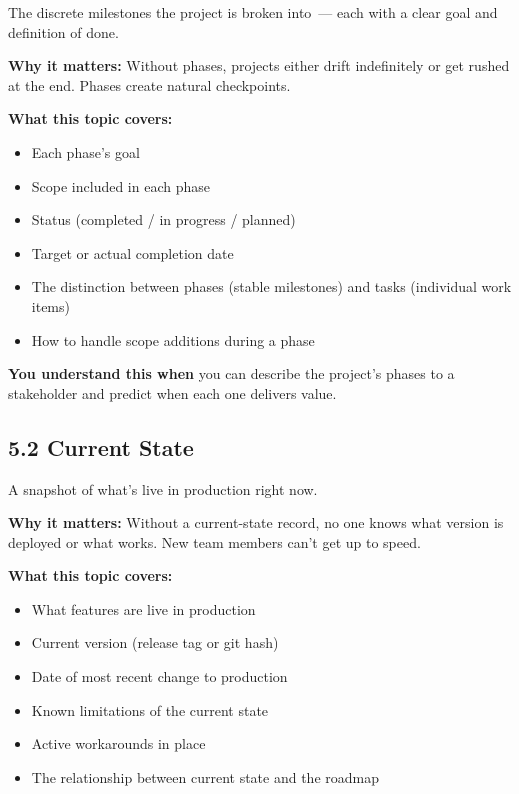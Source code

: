 The discrete milestones the project is broken into~--- each with a clear goal and definition of done.

\textbf{Why it matters:} Without phases, projects either drift indefinitely or get rushed at the end. Phases create natural checkpoints.

\textbf{What this topic covers:}

\begin{itemize}
\tightlist
\item
  Each phase's goal
\item
  Scope included in each phase
\item
  Status (completed / in progress / planned)
\item
  Target or actual completion date
\item
  The distinction between phases (stable milestones) and tasks (individual work items)
\item
  How to handle scope additions during a phase
\end{itemize}

\noindent{}\textbf{You understand this when} you can describe the project's phases to a stakeholder and predict when each one delivers value.

\subsection*{5.2 Current State}\label{project-planning-guide:52-current-state}

A snapshot of what's live in production right now.

\textbf{Why it matters:} Without a current-state record, no one knows what version is deployed or what works. New team members can't get up to speed.

\textbf{What this topic covers:}

\begin{itemize}
\tightlist
\item
  What features are live in production
\item
  Current version (release tag or git hash)
\item
  Date of most recent change to production
\item
  Known limitations of the current state
\item
  Active workarounds in place
\item
  The relationship between current state and the roadmap
\end{itemize}

